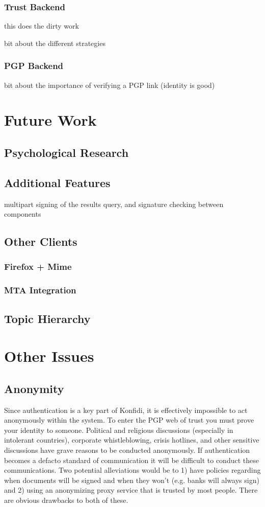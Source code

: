 \documentclass{acm_proc_article-sp}
\begin{document}
\subsubsection{Trust Backend}
this does the dirty work

bit about the different strategies

\subsubsection{PGP Backend}
bit about the importance of verifying a PGP link (identity is good)

\section{Future Work}
\subsection{Psychological Research}
\subsection{Additional Features}
multipart signing of the results query, and signature checking between components
\subsection{Other Clients}
\subsubsection{Firefox + Mime}
\subsubsection{MTA Integration}
\subsection{Topic Hierarchy}
\section{Other Issues}
\subsection{Anonymity}
Since authentication is a key part of Konfidi, it is effectively impossible to act anonymously within the system.  To enter the PGP web of trust you must prove your identity to someone.  Political and religious discussions (especially in intolerant countries), corporate whistleblowing, crisis hotlines, and other sensitive discussions have grave reasons to be conducted anonymously.  If authentication becomes a defacto standard of communication it will be difficult to conduct these communications.  Two potential alleviations would be to 1) have policies regarding when documents will be signed and when they won't (e.g. banks will always sign) and 2) using an anonymizing proxy service that is trusted by most people.  There are obvious drawbacks to both of these.\cite{fenton05iim}
\end{document}
